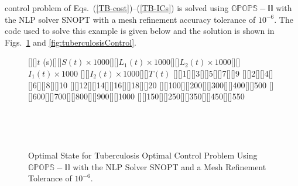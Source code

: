 \documentclass[10pt]{article}
\newenvironment{shadedframe}{%
  \def\FrameCommand{\fcolorbox{black}{shadecolor}}%
  \MakeFramed {\FrameRestore}}
{\endMakeFramed}
\begin{document}
control problem of Eqs.~(\ref{TB-cost})--(\ref{TB-ICs}) is solved
using $\mathbb{GPOPS-II}$ with the NLP solver SNOPT with a mesh
refinement accuracy tolerance of $10^{-6}$.   The code used to solve
this example is given below and the solution is shown in
Figs.~\ref{fig:tuberculosisState} and \ref{fig:tuberculosisControl}.
\begin{shadedframe}



\end{shadedframe}
\begin{figure}[h]
\psfragscanon
{}[][]{$t$ (s)}[][]{$S(t)\times 1000$}[][]{$L_1(t)\times 1000$}[][]{$L_2(t)\times 1000$}[][]{$I_1(t)\times 1000$}
[][]{$I_2(t)\times 1000$}[][]{$T(t)$}
[][]{\footnotesize 1}[][]{\footnotesize 3}[][]{\footnotesize 5}[][]{\footnotesize 7}[][]{\footnotesize 9}
[][]{\footnotesize 2}[][]{\footnotesize 4}[][]{\footnotesize 6}[][]{\footnotesize 8}[][]{\footnotesize 10}
[][]{\footnotesize 12}[][]{\footnotesize 14}[][]{\footnotesize 16}[][]{\footnotesize 18}[][]{\footnotesize 20}
[][]{\footnotesize 100}[][]{\footnotesize 200}[][]{\footnotesize 300}[][]{\footnotesize 400}[][]{\footnotesize 500}
[][]{\footnotesize 600}[][]{\footnotesize 700}[][]{\footnotesize 800}[][]{\footnotesize 900}[][]{\footnotesize 1000}
[][]{\footnotesize 150}[][]{\footnotesize 250}[][]{\footnotesize 350}[][]{\footnotesize 450}[][]{\footnotesize 550}
\centering
\hspace*{-0.5in}~~~

\hspace*{-0.5in}~~~

\hspace*{-0.5in}~~~

   \caption{Optimal State for Tuberculosis Optimal Control Problem Using $\mathbb{GPOPS-II}$ with the NLP Solver SNOPT and a Mesh  Refinement Tolerance of $10^{-6}$. \label{fig:tuberculosisState}}
\end{figure}
\end{document}
